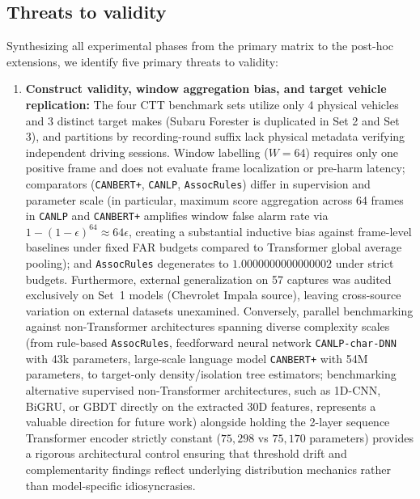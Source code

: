 \documentclass[12pt, a4paper, reqno, oneside]{book}
\DeclareRobustCommand{\code}[1]{\nolinkurl{#1}}
\begin{document}
\subsection{Threats to validity}\label{sec:threats-to-validity}
Synthesizing all experimental phases from the primary matrix to the post-hoc extensions, we identify five primary threats to validity:
\begin{enumerate}
    \item \textbf{Construct validity, window aggregation bias, and target vehicle replication:} The four CTT benchmark sets utilize only 4 physical vehicles and 3 distinct target makes (Subaru Forester is duplicated in Set 2 and Set 3), and partitions by recording-round suffix lack physical metadata verifying independent driving sessions. Window labelling ($W=64$) requires only one positive frame and does not evaluate frame localization or pre-harm latency; comparators (\code{CANBERT+}, \code{CANLP}, \code{AssocRules}) differ in supervision and parameter scale (in particular, maximum score aggregation across 64 frames in \code{CANLP} and \code{CANBERT+} amplifies window false alarm rate via $1 - (1 - \epsilon)^{64} \approx 64\epsilon$, creating a substantial inductive bias against frame-level baselines under fixed FAR budgets compared to Transformer global average pooling); and \code{AssocRules} degenerates to $1.0000000000000002$ under strict budgets. Furthermore, external generalization on 57 captures was audited exclusively on Set~1 models (Chevrolet Impala source), leaving cross-source variation on external datasets unexamined. Conversely, parallel benchmarking against non-Transformer architectures spanning diverse complexity scales (from rule-based \code{AssocRules}, feedforward neural network \code{CANLP-char-DNN} with 43k parameters, large-scale language model \code{CANBERT+} with 54M parameters, to target-only density/isolation tree estimators; benchmarking alternative supervised non-Transformer architectures, such as 1D-CNN, BiGRU, or GBDT directly on the extracted 30D features, represents a valuable direction for future work) alongside holding the 2-layer sequence Transformer encoder strictly constant ($75{,}298$ vs $75{,}170$ parameters) provides a rigorous architectural control ensuring that threshold drift and complementarity findings reflect underlying distribution mechanics rather than model-specific idiosyncrasies.

\end{enumerate}
\end{document}
